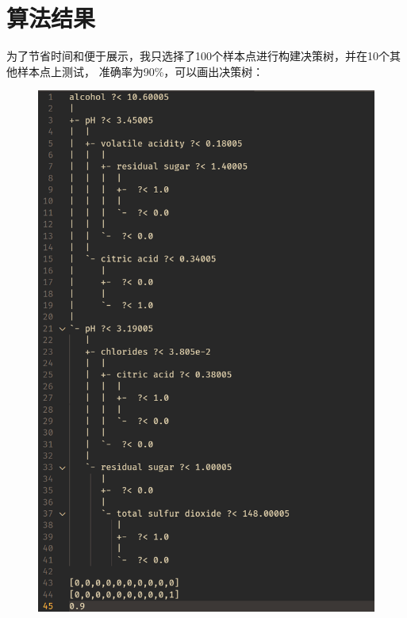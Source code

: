 \documentclass{article}
\begin{document}
\section{算法结果}
为了节省时间和便于展示，我只选择了100个样本点进行构建决策树，并在10个其他样本点上测试，
准确率为90\%，可以画出决策树：
\begin{figure}[H]
	\centering
	\includegraphics[width=\linewidth]{1.png}
\end{figure}
\end{document}
